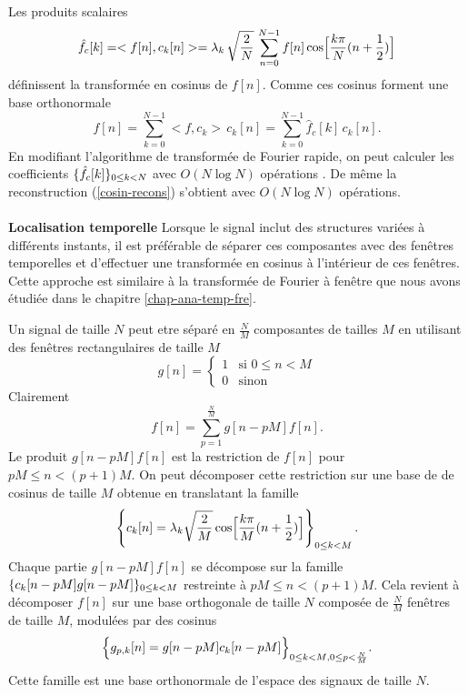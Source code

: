 Les produits scalaires
\begin{equation}
\label{DCT_I}
{\hat f_c [k]}  = <f[n], c_k[n] > =
\lambda_k\, \sqrt {\frac 2 N}\,
\sum_{n=0} ^{N-1} f[n] \cos\Bigl[\frac {k \pi} N (n+{\frac 1 2})\Bigr]
\end{equation}
d\'efinissent la transform\'ee en cosinus de
$f[n]$. Comme ces cosinus forment une base orthonormale
\begin{equation}
\label{cosin-recons}
{f[n]}  =
\sum_{k=0} ^{N-1} <f, c_k >\, c_k [n] =
\sum_{k=0} ^{N-1} \hat f_c [k] \,c_k [n] .
\end{equation}
En modifiant l'algorithme de transform\'ee de Fourier rapide,
on peut calculer les coefficients $\{\hat f_c [k]\}_{ 0 \leq k < N}$
avec $O(N \log N)$ op\'erations \cite{vetterli}.
De m\^eme la reconstruction
(\ref{cosin-recons}) s'obtient avec
$O(N \log N)$ op\'erations.\\
\\
{\bf Localisation temporelle}
Lorsque le signal
inclut des structures vari\'ees \`a diff\'erents instants,
il est pr\'ef\'erable de s\'eparer ces composantes avec des fen\^etres
temporelles et d'effectuer une transform\'ee en cosinus \`a l'int\'erieur
de ces fen\^etres. Cette approche est similaire \`a
la transform\'ee de Fourier \`a fen\^etre que nous avons \'etudi\'ee
dans le chapitre \ref{chap-ana-temp-fre}.


Un signal de taille $N$ peut etre s\'epar\'e en $\frac N M$ composantes
de tailles $M$ en utilisant
des fen\^etres rectangulaires de taille $M$
\[
g[n] = \left\{
\begin{array}{ll}
1 & \mbox{si $0 \leq n < M $}\\
0 & \mbox{sinon}
\end{array}
\right.
\]
Clairement
\[
f[n] = \sum_{p=1}^{\frac N M} g[n-pM] f[n] .
\]
Le produit $g[n - pM] f[n]$ est la
restriction de $f[n]$ pour $p M \leq n < (p+1) M$.
On peut d\'ecomposer cette restriction sur une base de
de cosinus de taille $M$ obtenue en translatant la famille
\[
\left\{ c_k [n] = {\lambda_k} \sqrt {\frac 2 M}
\cos\Bigl[\frac {k \pi} M (n+{\frac 1 2})\Bigr] \right\}_{ 0 \leq k < M} .
\]
Chaque partie
$g[n - pM] f[n]$ se d\'ecompose sur la
famille $\{ c_k [n-pM] g[n-pM] \}_{ 0 \leq k < M}$ restreinte \`a
$p M \leq n < (p+1) M$.
Cela revient \`a d\'ecomposer $f[n]$ sur une base orthogonale
de taille $N$ compos\'ee de $\frac N M$ fen\^etres de taille $M$,
modul\'ees par des cosinus
\begin{equation}
\label{base-loc-cs}
\Bigl\{ g_{p,k} [n] =
g[n-pM] c_k [n-pM] \Bigr\}_{{ 0 \leq k < M}, 0 \leq p < \frac N M} .
\end{equation}
Cette famille est une base orthonormale
de l'espace des signaux de taille $N$.\\

